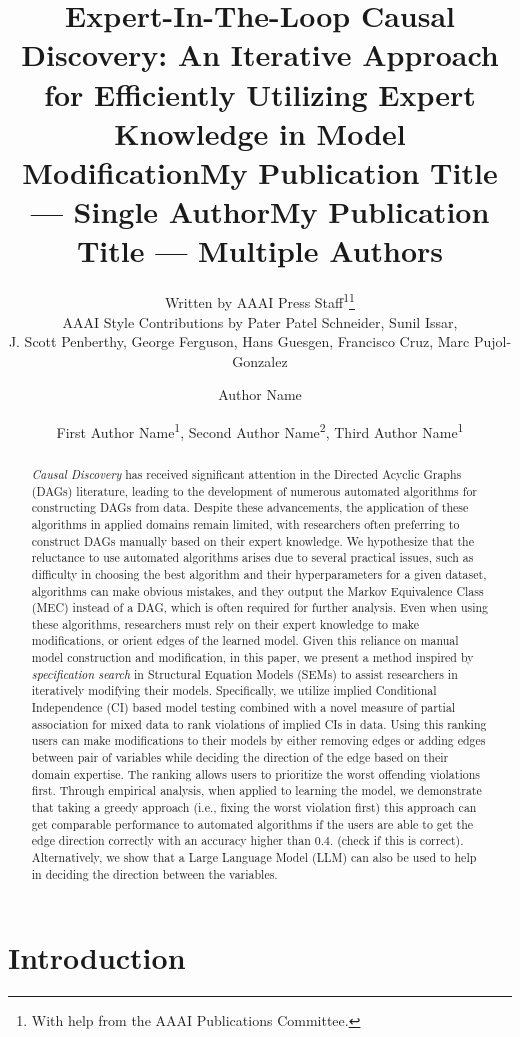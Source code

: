 \documentclass[letterpaper]{article} %
\title{Expert-In-The-Loop Causal Discovery: An Iterative Approach for Efficiently Utilizing Expert Knowledge in Model Modification}
\author{
    Written by AAAI Press Staff\textsuperscript{\rm 1}\thanks{With help from the AAAI Publications Committee.}\\
    AAAI Style Contributions by Pater Patel Schneider,
    Sunil Issar,\\
    J. Scott Penberthy,
    George Ferguson,
    Hans Guesgen,
    Francisco Cruz\equalcontrib,
    Marc Pujol-Gonzalez\equalcontrib
}
\title{My Publication Title --- Single Author}
\author {
    Author Name
}
\title{My Publication Title --- Multiple Authors}
\author {
    First Author Name\textsuperscript{\rm 1},
    Second Author Name\textsuperscript{\rm 2},
    Third Author Name\textsuperscript{\rm 1}
}
\begin{document}
\maketitle

\begin{abstract}
	\emph{Causal Discovery} has received significant attention in the
	Directed Acyclic Graphs (DAGs) literature, leading to the development
	of numerous automated algorithms for constructing DAGs from data.
	Despite these advancements, the application of these algorithms in
	applied domains remain limited, with researchers often preferring to
	construct DAGs manually based on their expert knowledge. We hypothesize
	that the reluctance to use automated algorithms arises due to several
	practical issues, such as difficulty in choosing the best algorithm and
	their hyperparameters for a given dataset, algorithms can make obvious
	mistakes, and they output the Markov Equivalence Class (MEC) instead of
	a DAG, which is often required for further analysis. Even when using
	these algorithms, researchers must rely on their expert knowledge to
	make modifications, or orient edges of the learned model. Given this
	reliance on manual model construction and modification, in this paper,
	we present a method inspired by \emph{specification search} in
	Structural Equation Models (SEMs) to assist researchers in iteratively
	modifying their models. Specifically, we utilize implied Conditional
	Independence (CI) based model testing combined with a novel measure of
	partial association for mixed data to rank violations of implied CIs in
	data. Using this ranking users can make modifications to their models
	by either removing edges or adding edges between pair of variables
	while deciding the direction of the edge based on their domain
	expertise. The ranking allows users to prioritize the worst offending
	violations first. Through empirical analysis, when applied to learning
	the model, we demonstrate that taking a greedy approach (i.e., fixing
	the worst violation first) this approach can get comparable performance
	to automated algorithms if the users are able to get the edge direction
	correctly with an accuracy higher than $ 0.4 $. (check if this is
	correct). Alternatively, we show that a Large Language Model (LLM) can
	also be used to help in deciding the direction between the variables.
\end{abstract}

\section{Introduction}
\end{document}
